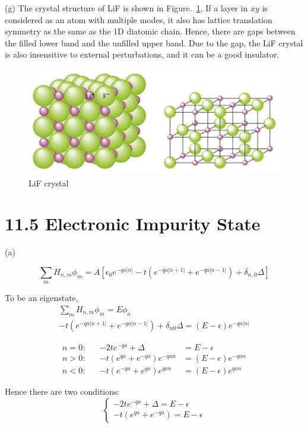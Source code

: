 \documentclass[a4paper,11pt]{article}
\begin{document}
(g) The crystal structure of LiF is shown in Figure.~\ref{fig:lif}. If a layer in $xy$ is considered as an atom with multiple modes, it also has lattice translation symmetry as the same as the 1D diatomic chain. Hence, there are gaps between the filled lower band and the unfilled upper band. Due to the gap, the LiF crystal is also insensitive to external perturbations, and it can be a good insulator.

\begin{figure}[b]
    \centering
    \includegraphics[width=0.35\linewidth]{LiFStructure.jpg}
    \caption{LiF crystal}
    \label{fig:lif}
\end{figure}


\section{11.5 Electronic Impurity State}

(a)

\begin{equation}
    \sum_{m}H_{n, m} \phi_m = A\left[\epsilon_0e^{-qa|n|}-t\left(e^{-qa|n+1|}+e^{-qa|n-1|}\right)+\delta_{n, 0}\Delta\right]
\end{equation}

To be an eigenstate,
\begin{gather}
    \sum_m H_{n, m}\phi_m = E\phi_n \\
    -t\left(e^{-qa|n+1|}+e^{-qa|n-1|}\right) + \delta_{n0}\Delta = (E-\epsilon)e^{-qa|n|}
\end{gather}

\begin{align}
    n=0:&& -2te^{-qa}+\Delta&=E-\epsilon \\
    n>0:&& -t\left(e^{qa}+e^{-qa}\right)e^{-qan}&=(E-\epsilon)e^{-qan} \\
    n<0:&& -t\left(e^{-qa}+e^{qa}\right)e^{qan}&=(E-\epsilon)e^{qan}
\end{align}

Hence there are two conditions:
\begin{equation}
    \begin{cases}
        -2te^{-qa} + \Delta = E-\epsilon \\
        -t(e^{qa}+e^{-qa})=E-\epsilon
    \end{cases}
\end{equation}
\end{document}
